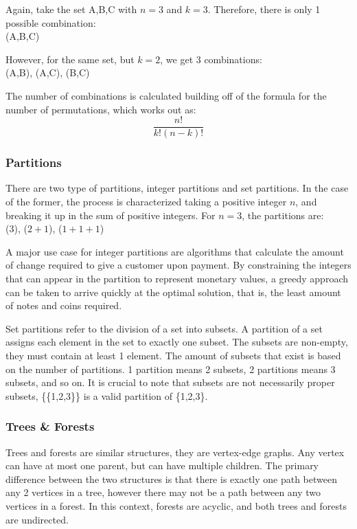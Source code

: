 \documentclass[12pt]{article}
\begin{document}
Again, take the set {A,B,C} with \(n=3\) and \(k=3\). Therefore, there is only 1 possible combination:\\
(A,B,C)

However, for the same set, but \(k=2\), we get 3 combinations:\\
(A,B), (A,C), (B,C)

The number of combinations is calculated building off of the formula for the number of permutations, which works out as: 
\[\frac{n!}{k!(n-k)!}\]

\subsubsection{Partitions}
There are two type of partitions, integer partitions and set partitions. In the case of the former, the process is characterized taking a positive integer \(n\), and breaking it up in the sum of positive integers. For \(n=3\), the partitions are: \\
(\(3\)), (\(2+1\)), (\(1+1+1\))

A major use case for integer partitions are algorithms that calculate the amount of change required to give a customer upon payment. By constraining the integers that can appear in the partition to represent monetary values, a greedy approach can be taken to arrive quickly at the optimal solution, that is, the least amount of notes and coins required.

Set partitions refer to the division of a set into subsets. A partition of a set assigns each element in the set to exactly one subset. The subsets are non-empty, they must contain at least 1 element. The amount of subsets that exist is based on the number of partitions. 1 partition means 2 subsets, 2 partitions means 3 subsets, and so on. It is crucial to note that subsets are not necessarily proper subsets, \{\{1,2,3\}\} is a valid partition of \{1,2,3\}.

\subsubsection{Trees \& Forests}
Trees and forests are similar structures, they are vertex-edge graphs. Any vertex can have at most one parent, but can have multiple children. The primary difference between the two structures is that there is exactly one path between any 2 vertices in a tree, however there may not be a path between any two vertices in a forest. In this context, forests are acyclic, and both trees and forests are undirected.
\end{document}
